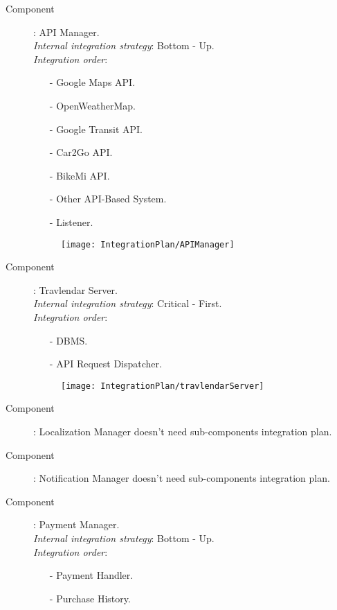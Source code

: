 \begin{description}
	\item[Component]: API Manager.\\
		\textit{Internal integration strategy}: Bottom - Up.\\
		\textit{Integration order}:
		\begin{itemize}
			\item[-] Google Maps API.
			\item[-] OpenWeatherMap.
			\item[-] Google Transit API.
			\item[-] Car2Go API.
			\item[-] BikeMi API.
			\item[-] Other API-Based System.
			\item[-] Listener.
		\end{itemize}
		
		\begin{figure}[H]
			\centering
			\texttt{[image: IntegrationPlan/APIManager]}
		\end{figure}
		
		
	\vskip1.5cm
	\item[Component]: Travlendar Server.\\
		\textit{Internal integration strategy}: Critical - First.\\
		\textit{Integration order}:
		\begin{itemize}
			\item[-] DBMS.
			\item[-] API Request Dispatcher.
		\end{itemize}
		
		\begin{figure}[H]
			\centering
			\texttt{[image: IntegrationPlan/travlendarServer]}
		\end{figure}
	
	
	\vskip1.5cm
	\item[Component]: Localization Manager doesn't need sub-components integration plan.

	\vskip1.5cm
	\item[Component]: Notification Manager doesn't need sub-components integration plan.
	
	\vskip1.5cm
	\item[Component]: Payment Manager.\\
		\textit{Internal integration strategy}: Bottom - Up.\\
		\textit{Integration order}:
		\begin{itemize}
			\item[-] Payment Handler.
			\item[-] Purchase History.
		\end{itemize}
		

\end{description}
